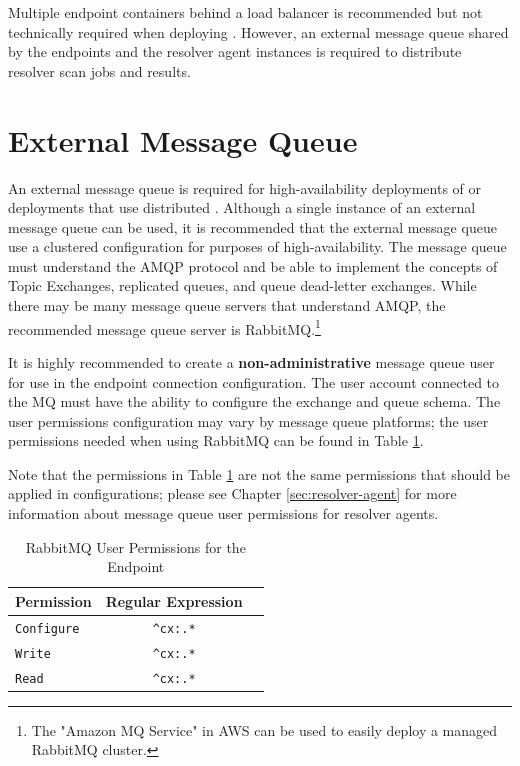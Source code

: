 Multiple \cxoneflow endpoint containers behind a load balancer is recommended but not technically required
when deploying .  However, an external message queue shared by the \cxoneflow endpoints
and the resolver agent instances is required to distribute resolver scan jobs and results.  

\section{External Message Queue}\label{sec:external-mq}

An external message queue is required for high-availability deployments of \cxoneflow or deployments that use distributed
.  Although a single instance of an external message queue can be used, it is
recommended that the external message queue use a clustered configuration for purposes of high-availability.  The message queue
must understand the AMQP protocol and be able to implement the concepts of Topic Exchanges, replicated queues, and queue
dead-letter exchanges.  While there may be many message queue servers that understand AMQP, the recommended message queue
server is RabbitMQ.\footnote{The "Amazon MQ Service" in AWS can be used to easily deploy a managed RabbitMQ cluster.}

It is highly recommended to create a \textbf{non-administrative} message queue user for use in the \cxoneflow endpoint
connection configuration.  The user account connected to the MQ must have the ability to configure the
exchange and queue schema.  The user permissions configuration may vary by message queue platforms; the user permissions
needed when using RabbitMQ can be found in Table \ref{tab:server-mq-user-perms}.  

Note that the permissions in Table \ref{tab:server-mq-user-perms} are not the same permissions
that should be applied in  configurations; please see Chapter \ref{sec:resolver-agent} for more
information about message queue user permissions for resolver agents.

\begin{table}[ht]
    \caption{RabbitMQ User Permissions for the \cxoneflow Endpoint}  
    \label{tab:server-mq-user-perms}      
    \begin{tabularx}{\textwidth}{lcl}
        \toprule
        \textbf{Permission} & \textbf{Regular Expression} \\
        \midrule
        \texttt{Configure} & \texttt{\^{}cx:.*} \\
        \midrule
        \texttt{Write} & \texttt{\^{}cx:.*} \\
        \midrule
        \texttt{Read} & \texttt{\^{}cx:.*} \\
        \midrule
        \bottomrule
    \end{tabularx}
\end{table}



